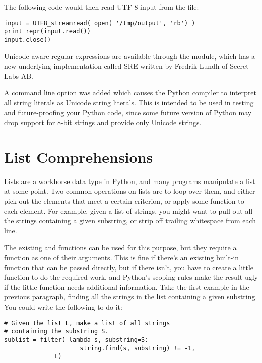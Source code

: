 \documentclass{howto}
\begin{document}
The following code would then read UTF-8 input from the file:

\begin{verbatim}
input = UTF8_streamread( open( '/tmp/output', 'rb') )
print repr(input.read())
input.close()
\end{verbatim}

Unicode-aware regular expressions are available through the
 module, which has a new underlying implementation called
SRE written by Fredrik Lundh of Secret Labs AB. 

A  command line option was added which causes the Python
compiler to interpret all string literals as Unicode string literals.
This is intended to be used in testing and future-proofing your Python
code, since some future version of Python may drop support for 8-bit
strings and provide only Unicode strings.

\section{List Comprehensions}

Lists are a workhorse data type in Python, and many programs
manipulate a list at some point.  Two common operations on lists are
to loop over them, and either pick out the elements that meet a
certain criterion, or apply some function to each element.  For
example, given a list of strings, you might want to pull out all the
strings containing a given substring, or strip off trailing whitespace
from each line.  

The existing  and  functions can be
used for this purpose, but they require a function as one of their
arguments.  This is fine if there's an existing built-in function that
can be passed directly, but if there isn't, you have to create a
little function to do the required work, and Python's scoping rules
make the result ugly if the little function needs additional
information.  Take the first example in the previous paragraph,
finding all the strings in the list containing a given substring.  You
could write the following to do it:

\begin{verbatim}
# Given the list L, make a list of all strings 
# containing the substring S.
sublist = filter( lambda s, substring=S: 
                     string.find(s, substring) != -1,
	          L)
\end{verbatim}
\end{document}

